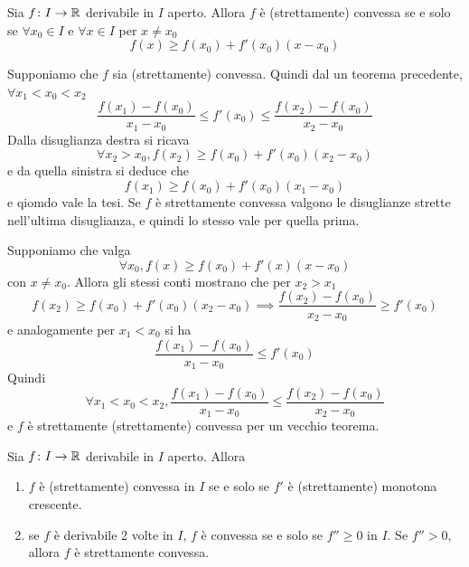 \documentclass[a4paper]{article}
\begin{document}
\begin{snippettheorem}{}
    Sia \(f\colon I \to \mathbb{R}\) derivabile in \(I\) aperto. Allora \(f\) è (strettamente)
    convessa se e solo se \(\forall x_0 \in I\) e \(\forall x \in I\) per \(x \neq x_0\)
    \[
        f(x) \geq f(x_0) + f'(x_0)(x-x_0)
    \]
\end{snippettheorem}

\begin{snippetproof}{}
    \begin{iffproof}
        \item Supponiamo che \(f\) sia (strettamente) convessa.
        Quindi dal un teorema precedente, \(\forall x_1 < x_0 < x_2\)
        \[
            \frac{f(x_1) - f(x_0)}{x_1 - x_0} \leq f'(x_0) \leq \frac{f(x_2) - f(x_0)}{x_2 - x_0}
        \]
        Dalla disuglianza destra si ricava
        \[
            \forall x_2 > x_0, f(x_2) \geq f(x_0) + f'(x_0)(x_2 - x_0)
        \]
        e da quella sinistra si deduce che
        \[
            f(x_1) \geq f(x_0) + f'(x_0)(x_1 - x_0)
        \]
        e qiomdo vale la tesi. Se \(f\) è strettamente convessa valgono le disuglianze
        strette nell'ultima disuglianza, e quindi lo stesso vale per quella prima.
        \item Supponiamo che valga
        \[
            \forall x_0, f(x) \geq f(x_0) + f'(x)(x-x_0)
        \]
        con \(x \neq x_0\).
        Allora gli stessi conti mostrano che per \(x_2 > x_1\)
        \[
            f(x_2) \geq f(x_0) + f'(x_0)(x_2 - x_0)
            \implies
            \frac{f(x_2) - f(x_0)}{x_2 - x_0} \geq f'(x_0)
        \]
        e analogamente per \(x_1 < x_0\) si ha
        \[
            \frac{f(x_1) - f(x_0)}{x_1 - x_0} \leq f'(x_0)
        \]
        Quindi
        \[
        \forall x_1 < x_0 < x_2,
            \frac{f(x_1) - f(x_0)}{x_1 - x_0} \leq \frac{f(x_2) - f(x_0)}{x_2 - x_0}
        \]
        e \(f\) è strettamente (strettamente) convessa per un vecchio teorema.
    \end{iffproof}
\end{snippetproof}

\begin{snippettheorem}{}
    Sia \(f\colon I \to \mathbb{R}\) derivabile in \(I\) aperto. Allora
    \begin{enumerate}
        \item \(f\) è (strettamente) convessa in \(I\) se e solo se \(f'\) è (strettamente) monotona crescente.
        \item se \(f\) è derivabile 2 volte in \(I\), \(f\) è convessa
        se e solo se \(f'' \geq 0\) in \(I\). Se \(f'' > 0\), allora \(f\) è strettamente convessa.
    \end{enumerate}
\end{snippettheorem}
\end{document}
